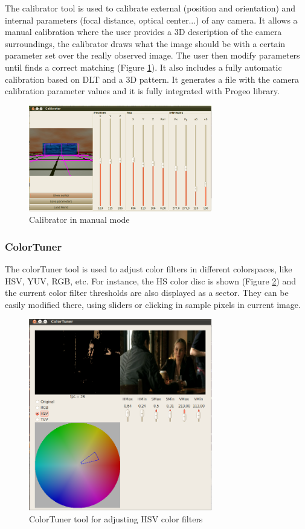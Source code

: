 \documentclass[twocolumn]{svjour3}          %
\begin{document}
The calibrator tool is used to calibrate external (position and orientation) and internal parameters (focal distance, optical center...) of any camera. It allows a manual calibration where the user provides a 3D description of the camera surroundings, the calibrator draws what the image should be with a certain parameter set over the really observed image. The user then modify parameters until finds a correct matching (Figure \ref{fig:calibrator}). It also includes a fully automatic calibration based on DLT and a 3D pattern. It generates a file with the camera calibration parameter values and it is fully integrated with Progeo library.

\begin{figure}[h!]
  \includegraphics[width=8cm]{calibratorGUI.png}
\caption{Calibrator in manual mode}
\label{fig:calibrator}
\end{figure}

\subsubsection{ColorTuner}

The colorTuner tool is used to adjust color filters in different colorspaces, like HSV, YUV, RGB, etc. For instance, the HS color disc is shown (Figure \ref{fig:colortuner}) and the current color filter thresholds are also displayed as a sector. They can be easily modified there, using sliders or clicking in sample pixels in current image.

\begin{figure}[h!]
  \includegraphics[width=8cm]{colorTunerHSV.png}
\caption{ColorTuner tool for adjusting HSV color filters}
\label{fig:colortuner}
\end{figure}
\end{document}
